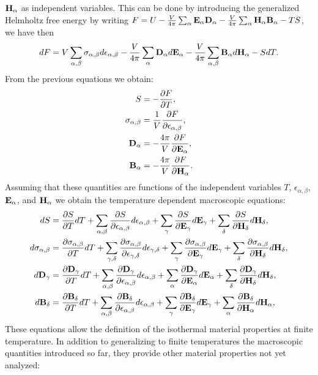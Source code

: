 \documentclass[12pt,a4paper]{article}
\begin{document}
{${\bf H}_\alpha$ as independent variables.
This can be done by introducing the generalized Helmholtz free energy 
by writing
$F=U-{V \over 4 \pi}\sum_{\alpha} {\bf E}_\alpha {\bf D}_\alpha -
{V\over 4 \pi} \sum_{\alpha} {\bf H}_\alpha {\bf B}_\alpha - TS $, 
we have then
\begin{equation}
dF = V \sum_{\alpha,\beta} \sigma_{\alpha,\beta} d \epsilon_{\alpha,\beta}
- {V\over 4 \pi} \sum_\alpha {\bf D}_\alpha d {\bf E}_\alpha - 
{V \over 4 \pi} \sum_{\alpha,\beta} {\bf B}_{\alpha} d {\bf H}_\alpha - S dT.
\end{equation}
From the previous equations we obtain:
\begin{align}
S&= -{\partial F \over \partial T}, \\
\sigma_{\alpha,\beta}&= {1\over V}
{\partial F \over \partial \epsilon_{\alpha,\beta}}, \\
{\bf D}_{\alpha}&= -{4 \pi \over V}
{\partial F \over \partial {\bf E}_{\alpha}}, \\
{\bf B}_{\alpha}&= -{4 \pi \over V}
{\partial F \over \partial {\bf H}_{\alpha}}.
\end{align}
Assuming that these quantities are functions of the independent variables
$T$, $\epsilon_{\alpha,\beta}$, ${\bf E}_\alpha$, and ${\bf H}_\alpha$ we
obtain the temperature dependent macroscopic equations:
\begin{align}
dS&= {\partial S \over \partial T} dT+\sum_{\alpha,\beta}
{\partial S \over \partial \epsilon_{\alpha,\beta}}d\epsilon_{\alpha,\beta}
+\sum_\gamma{\partial S \over \partial {\bf E}_{\gamma}}d{\bf E}_{\gamma}+ 
\sum_\delta{\partial S \over \partial {\bf H}_{\delta}}d{\bf H}_{\delta}, \\
d\sigma_{\alpha,\beta}&=
{\partial \sigma_{\alpha,\beta} \over \partial T} dT+\sum_{\gamma,\delta}
{\partial \sigma_{\alpha,\beta} \over \partial 
\epsilon_{\gamma,\delta}}d\epsilon_{\gamma,\delta}
+\sum_\gamma{\partial \sigma_{\alpha,\beta} \over \partial 
{\bf E}_{\gamma}}d{\bf E}_{\gamma}+ 
\sum_\delta{\partial \sigma_{\alpha,\beta} \over \partial 
{\bf H}_{\delta}}d{\bf H}_{\delta}, \\
d{\bf D}_\gamma&=
{\partial  {\bf D}_\gamma \over \partial T} dT+\sum_{\alpha,\beta}
{\partial {\bf D}_\gamma \over \partial \epsilon_{\alpha,\beta}}
d\epsilon_{\alpha,\beta}
+\sum_\alpha{\partial {\bf D}_\gamma \over \partial {\bf E}_{\alpha}}d{\bf E}_{\alpha}+ 
\sum_\delta{\partial {\bf D}_\gamma \over \partial {\bf H}_{\delta}}d{\bf H}_{\delta}, \\
d{\bf B}_\delta&=
{\partial {\bf B}_\delta \over \partial T} dT+\sum_{\alpha,\beta}
{\partial {\bf B}_\delta \over \partial \epsilon_{\alpha,\beta}}
d\epsilon_{\alpha,\beta}
+\sum_\gamma{\partial {\bf B}_\delta \over \partial {\bf E}_{\gamma}}
d{\bf E}_{\gamma}+ 
\sum_\alpha{\partial {\bf B}_\delta \over \partial {\bf H}_{\alpha}}
d{\bf H}_{\alpha}, 
\end{align}
These equations allow the definition of the isothermal material properties 
at finite temperature. In addition to generalizing to finite temperatures
the macroscopic quantities introduced so far, they provide other material 
properties not yet analyzed:

}
\end{document}

